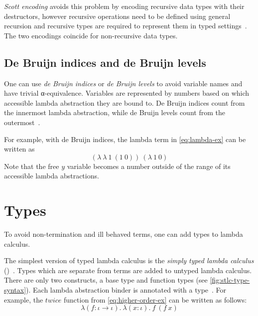 \emph{Scott encoding} avoids this problem by encoding recursive data types with
their destructors, however recursive operations need to be defined using general
recursion and recursive types are required to represent them in typed
settings~\cite{combinator-Curry, church-Koopman, scott-Jansen}. The two
encodings coincide for non-recursive data types.

\subsection{De Bruijn indices and de Bruijn levels}\label{ssec:debruijn}

One can use \emph{de Bruijn indices} or \emph{de Bruijn levels} to avoid
variable names and have trivial α-equivalence. Variables are represented by
numbers based on which accessible lambda abstraction they are bound to. De
Bruijn indices count from the innermost lambda abstraction, while de Bruijn
levels count from the outermost~\cite{debruijn}.

For example, with de Bruijn indices, the lambda term in \cref{eq:lambda-ex} can
be written as
\begin{equation}
  (\lambda\ \lambda\ 1\ (1\ 0))\ (\lambda\ 1\ 0)
  \label{eq:lambda-ex-index}
\end{equation}
Note that the free \(y\) variable becomes a number outside of the range of its
accessible lambda abstractions.

\section{Types}\label{sec:types}

To avoid non-termination and ill behaved terms, one can add types to lambda
calculus.

The simplest version of typed lambda calculus is the \emph{simply typed lambda
  calculus} ()~\cite{type-Church}. Types which are separate from
terms are added to untyped lambda calculus. There are only two constructs, a
base type and function types (see \cref{fig:stlc-type-syntax}). Each lambda
abstraction binder is annotated with a type~\cite{type-Barendregt,
  type-Pierce}. For example, the \(\mathit{twice}\) function from
\cref{eq:higher-order-ex} can be written as follows:
\begin{equation}
  \lambda (f : \iota \to \iota).\ \lambda (x : \iota).\ f\ (f\ x)
  \label{eq:stlc-higher-order-ex}
\end{equation}

